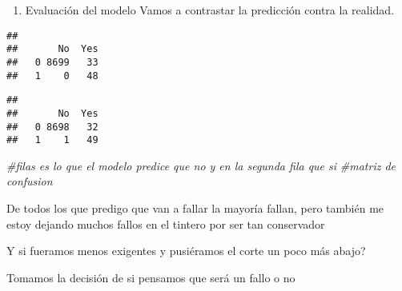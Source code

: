 \documentclass[
]{article}
\newenvironment{Shaded}{\begin{snugshade}}{\end{snugshade}}
\newcommand{\CommentTok}[1]{\textcolor[rgb]{0.56,0.35,0.01}{\textit{#1}}}
\newcommand{\DecValTok}[1]{\textcolor[rgb]{0.00,0.00,0.81}{#1}}
\newcommand{\FloatTok}[1]{\textcolor[rgb]{0.00,0.00,0.81}{#1}}
\newcommand{\FunctionTok}[1]{\textcolor[rgb]{0.00,0.00,0.00}{#1}}
\newcommand{\NormalTok}[1]{#1}
\newcommand{\OtherTok}[1]{\textcolor[rgb]{0.56,0.35,0.01}{#1}}
\newcommand{\SpecialCharTok}[1]{\textcolor[rgb]{0.00,0.00,0.00}{#1}}
\providecommand{\tightlist}{%
  \setlength{\itemsep}{0pt}\setlength{\parskip}{0pt}}
\begin{document}
\begin{enumerate}
\def\labelenumi{\arabic{enumi}.}
\setcounter{enumi}{7}
\tightlist
\item
  Evaluación del modelo Vamos a contrastar la predicción contra la
  realidad.
\end{enumerate}

\begin{Shaded}
\end{Shaded}

\begin{verbatim}
##    
##       No  Yes
##   0 8699   33
##   1    0   48
\end{verbatim}

\begin{Shaded}
\end{Shaded}

\begin{verbatim}
##    
##       No  Yes
##   0 8698   32
##   1    1   49
\end{verbatim}

\begin{Shaded}
\begin{Highlighting}[]
\CommentTok{\#filas es lo que el modelo predice que no y en la segunda fila que si }
\CommentTok{\#matriz de confusion}
\end{Highlighting}
\end{Shaded}

De todos los que predigo que van a fallar la mayoría fallan, pero
también me estoy dejando muchos fallos en el tintero por ser tan
conservador

Y si fueramos menos exigentes y pusiéramos el corte un poco más abajo?

Tomamos la decisión de si pensamos que será un fallo o no

\begin{Shaded}
\end{Shaded}
\end{document}
